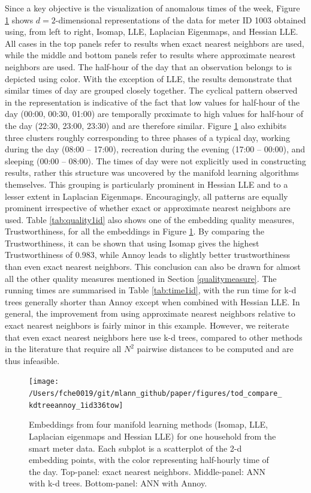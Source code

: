 \documentclass[12pt]{article}
\begin{document}
Since a key objective is the visualization of anomalous times of the week, Figure \ref{fig:todplot} shows \(d=2\)-dimensional representations of the data for meter ID 1003 obtained using, from left to right, Isomap, LLE, Laplacian Eigenmaps, and Hessian LLE. All cases in the top panels refer to results when exact nearest neighbors are used, while the middle and bottom panels refer to results where approximate nearest neighbors are used. The half-hour of the day that an observation belongs to is depicted using color. With the exception of LLE, the results demonstrate that similar times of day are grouped closely together. The cyclical pattern observed in the representation is indicative of the fact that low values for half-hour of the day (00:00, 00:30, 01:00) are temporally proximate to high values for half-hour of the day (22:30, 23:00, 23:30) and are therefore similar. Figure \ref{fig:todplot} also exhibits three clusters roughly corresponding to three phases of a typical day, working during the day (08:00 -- 17:00), recreation during the evening (17:00 -- 00:00), and sleeping (00:00 -- 08:00). The times of day were not explicitly used in constructing results, rather this structure was uncovered by the manifold learning algorithms themselves. This grouping is particularly prominent in Hessian LLE and to a lesser extent in Laplacian Eigenmaps. Encouragingly, all patterns are equally prominent irrespective of whether exact or approximate nearest neighbors are used.
Table \ref{tab:quality1id} also shows one of the embedding quality measures, Trustworthiness, for all the embeddings in Figure \ref{fig:todplot}. By comparing the Trustworthiness, it can be shown that using Isomap gives the highest Trustworthiness of 0.983, while Annoy leads to slightly better trustworthiness than even exact nearest neighbors. This conclusion can also be drawn for almost all the other quality measures mentioned in Section \ref{qualitymeasure}. The running times are summarised in Table \ref{tab:time1id}, with the run time for k-d trees generally shorter than Annoy except when combined with Hessian LLE. In general, the improvement from using approximate nearest neighbors relative to exact nearest neighbors is fairly minor in this example. However, we reiterate that even exact nearest neighbors here use k-d trees, compared to other methods in the literature that require all \(N^2\) pairwise distances to be computed and are thus infeasible.

\begin{figure}

{\centering \texttt{[image: /Users/fche0019/git/mlann\_github/paper/figures/tod\_compare\_kdtreeannoy\_1id336tow]} 

}

\caption{Embeddings from four manifold learning methods (Isomap, LLE, Laplacian eigenmaps and Hessian LLE) for one household from the smart meter data. Each subplot is a scatterplot of the 2-d embedding points, with the color representing half-hourly time of the day. Top-panel: exact nearest neighbors. Middle-panel: ANN with k-d trees. Bottom-panel: ANN with Annoy.}\label{fig:todplot}
\end{figure}
\end{document}
